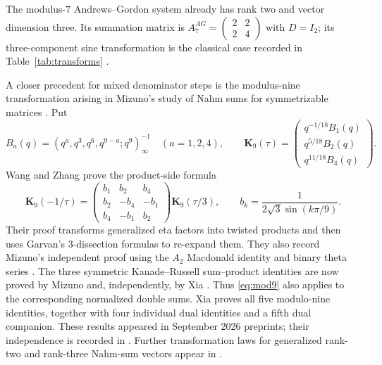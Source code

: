 \documentclass[11pt,reqno]{amsart}
\theoremstyle{remark}
\numberwithin{equation}{section}
\begin{document}
The modulus-$7$ Andrews--Gordon system already has rank two and vector
dimension three. Its summation matrix is
$A_7^{AG}=\left(\begin{smallmatrix}2&2\\2&4\end{smallmatrix}\right)$
with $D=I_2$; its three-component sine transformation is the classical
case recorded in Table~\ref{tab:transforms}
\cite{Andrews}\cite[Section~1.3]{Ono}.

A closer precedent for mixed denominator steps is the modulus-nine
transformation arising in Mizuno's study of Nahm sums for symmetrizable
matrices \cite{Mizuno}. Put
\[
 B_a(q)=(q^a,q^3,q^6,q^{9-a};q^9)_\infty^{-1}
 \quad(a=1,2,4),\qquad
 \mathbf K_9(\tau)=
 \begin{pmatrix}q^{-1/18}B_1(q)\\q^{5/18}B_2(q)\\q^{11/18}B_4(q)\end{pmatrix}.
\]
Wang and Zhang \cite[Theorem~1.1]{WangZhang} prove the product-side formula
\begin{equation}\label{eq:mod9}
 \mathbf K_9(-1/\tau)=
 \begin{pmatrix}b_1&b_2&b_4\\b_2&-b_4&-b_1\\b_4&-b_1&b_2\end{pmatrix}
 \mathbf K_9(\tau/3),\qquad
 b_k=\frac1{2\sqrt3\sin(k\pi/9)}.
\end{equation}
Their proof transforms generalized eta factors into twisted products and
then uses Garvan's $3$-dissection formulas to re-expand them.
They also record Mizuno's independent proof using the $A_2$ Macdonald
identity and binary theta series \cite[Remark~2]{WangZhang}.
The three symmetric Kanade--Russell sum--product identities are now
proved by Mizuno \cite[Theorem~1.1]{MizunoKR} and, independently, by
Xia \cite[Theorem~1.1]{Xia}. Thus \eqref{eq:mod9} also applies to the
corresponding normalized double sums. Xia proves all five modulo-nine
identities, together with four individual dual identities and a fifth
dual companion. These results appeared in September 2026 preprints; their independence
is recorded in \cite[Introduction, version~2]{MizunoKR}.
Further transformation laws for generalized rank-two and rank-three
Nahm-sum vectors appear in \cite{WangWang2,WangWang3}.
\end{document}
